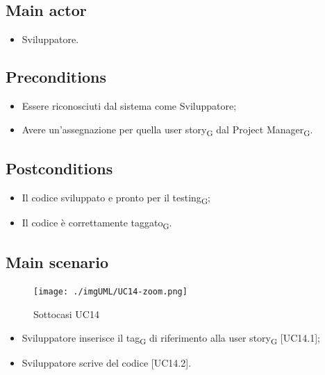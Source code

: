 \documentclass{article}
\begin{document}
    \subsection*{Main actor}
        \begin{itemize}
            \item Sviluppatore.
        \end{itemize}
    
    \subsection*{Preconditions}
        \begin{itemize}
            \item Essere riconosciuti dal sistema come Sviluppatore;
            \item Avere un'assegnazione per quella user story\textsubscript{G} dal Project Manager\textsubscript{G}.
        \end{itemize}
        
    \subsection*{Postconditions} 
        \begin{itemize}
            \item Il codice sviluppato e pronto per il testing\textsubscript{G};
            \item Il codice è correttamente taggato\textsubscript{G}.
        \end{itemize}
    
    \subsection*{Main scenario}
        \begin{figure}[h]
          \centering
          \texttt{[image: ./imgUML/UC14-zoom.png]}
          \caption{Sottocasi UC14}
          \label{fig:UC14_sottocasi}
        \end{figure}
        
        \begin{itemize}
            \item Sviluppatore inserisce il tag\textsubscript{G} di riferimento alla user story\textsubscript{G} [UC14.1];
            \item Sviluppatore scrive del codice [UC14.2].
        \end{itemize}
\end{document}
